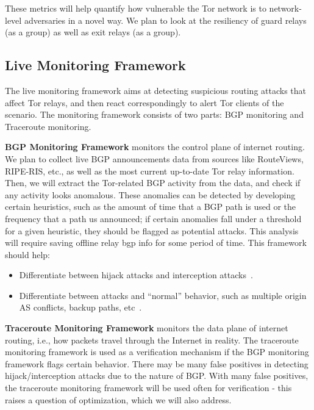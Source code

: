 \documentclass{acm_proc_article-sp}
\begin{document}
These metrics will help quantify how vulnerable the Tor network is to network-level adversaries in a novel way.  We plan to look at the resiliency of guard relays (as a group) as well as exit relays (as a group). 

\subsection{Live Monitoring Framework}

The live monitoring framework aims at detecting suspicious routing attacks that affect Tor relays, and then react correspondingly to alert Tor clients of the scenario. The monitoring framework consists of two parts: BGP monitoring and Traceroute monitoring.

{\bf BGP Monitoring Framework} monitors the control plane of internet routing. We plan to collect live BGP announcements data from sources like RouteViews, RIPE-RIS, etc., as well as the most current up-to-date Tor relay information. Then, we will extract the Tor-related BGP activity from the data, and check if any activity looks anomalous.  These anomalies can be detected by developing certain heuristics, such as the amount of time that a BGP path is used or the frequency that a path us announced; if certain anomalies fall under a threshold for a given heuristic, they should be flagged as potential attacks. This analysis will require saving offline relay bgp info for some period of time.  This framework should help:
\begin{itemize}
\item Differentiate between hijack attacks and interception attacks~\cite{ballani2007study}.
\item Differentiate between attacks and ``normal'' behavior, such as multiple origin AS conflicts, backup paths, etc~\cite{zhao2001analysis}.
\end{itemize}

{\bf Traceroute Monitoring Framework} monitors the data plane of internet routing, i.e., how packets travel through the Internet in reality. The traceroute monitoring framework is used as a verification mechanism if the BGP monitoring framework flags certain behavior. There may be many false positives in detecting hijack/interception attacks due to the nature of BGP.  With many false positives, the traceroute monitoring framework will be used often for verification - this raises a question of optimization, which we will also address.
\end{document}
